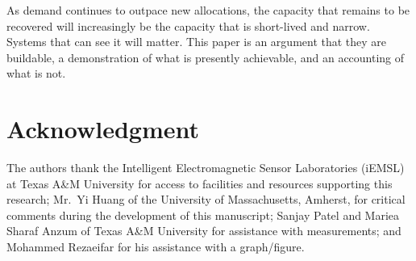 \documentclass[lettersize,journal]{IEEEtran}
\begin{document}
As demand continues to outpace new allocations, the capacity that
remains to be recovered will increasingly be the capacity that is
short-lived and narrow. Systems that can see it will matter. This paper
is an argument that they are buildable, a demonstration of what is
presently achievable, and an accounting of what is not.


\section*{\textbf{Acknowledgment}}
The authors thank the Intelligent Electromagnetic Sensor Laboratories
(iEMSL) at Texas A\&M University for access to facilities and resources
supporting this research; Mr.\ Yi Huang of the University of
Massachusetts, Amherst, for critical comments during the development of
this manuscript; Sanjay Patel and Mariea Sharaf Anzum of Texas A\&M
University for assistance with measurements; and Mohammed Rezaeifar for his 
assistance with a graph/figure.
\end{document}
